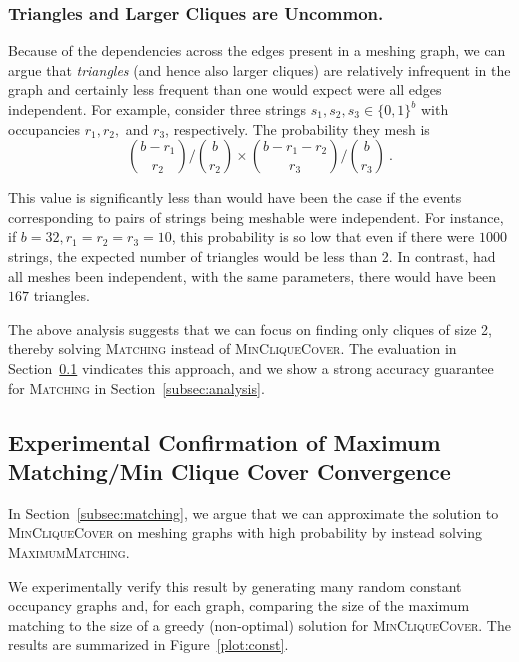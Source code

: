\subsubsection{Triangles and Larger Cliques are Uncommon.}
Because of the dependencies across the edges present in a meshing
graph, we can argue that \emph{triangles} (and hence also larger
cliques) are relatively infrequent in the graph and certainly less
frequent than one would expect were all edges independent.  For
example, consider three strings $s_1, s_2, s_3\in \{0,1\}^b$ with
occupancies $r_1, r_2,$ and $r_3$, respectively. The probability they
mesh is
\[
{\binom{b-r_1}{r_2}} \big / {\binom{b}{r_2}} \times {\binom{b-r_{1}-r_2 }{r_3}} \big / {\binom{b}{r_3}} \ . \]

This value is significantly less than would have been the case if the
events corresponding to pairs of strings being meshable were
independent.
For instance, if $b = 32, r_1=r_2=r_3 = 10$, this probability is so
low that even if there were $1000$ strings, the expected number of
triangles would be less than 2. In contrast, had all meshes been
independent, with the same parameters, there would have been $167$ triangles.

The above analysis suggests that we can focus on finding only cliques
of size 2, thereby solving \textsc{Matching} instead of
\textsc{MinCliqueCover}. The evaluation in
Section~\ref{subsec:exp} vindicates this approach, and we show a
strong accuracy guarantee for \textsc{Matching} in Section~\ref{subsec:analysis}.

\subsection{Experimental Confirmation of Maximum Matching/Min Clique Cover Convergence}
\label{subsec:exp}

In Section~\ref{subsec:matching}, we argue that we can approximate the solution to \textsc{MinCliqueCover} on meshing graphs with high probability by instead solving \textsc{MaximumMatching}.

We experimentally verify this result by generating many random constant occupancy graphs and, for each graph, comparing the size of the maximum matching to the size of a greedy (non-optimal) solution for \textsc{MinCliqueCover}.  The results are summarized in Figure~\ref{plot:const}.

